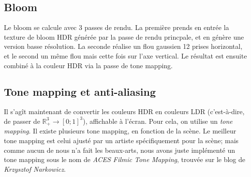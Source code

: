\documentclass[a4paper,12pt]{article}
\begin{document}
\subsection{Bloom}
Le bloom se calcule avec 3 passes de rendu. La première prends en entrée la texture de bloom HDR générée par la passe de rendu princpale,
et en génère une version basse résolution. La seconde réalise un flou gaussien 12 prises horizontal, et le second un même flou mais cette
fois sur l'axe vertical. Le résultat est ensuite combiné à la couleur HDR via la passe de tone mapping.

\subsection{Tone mapping et anti-aliasing}
Il s'agît maintenant de convertir les couleurs HDR en couleurs LDR (c'est-à-dire, de passer de $\mathbb{R}_+^3 \to [0; 1]^3$), affichable à l'écran.
Pour cela, on utilise un \emph{tone mapping}. Il existe plusieurs tone mapping, en fonction de la scène. Le meilleur tone mapping est celui
ajusté par un artiste spécifiquement pour la scène; mais comme aucun de nous n'a fait les beaux-arts, nous avons juste implémenté un tone
mapping sous le nom de \emph{ACES Filmic Tone Mapping}, trouvée sur le blog de \emph{Krzysztof Narkowicz}.
\end{document}
